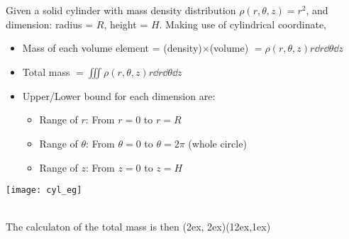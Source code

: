 \documentclass[class=article, crop=false, 12pt]{standalone}
\begin{document}
\begin{example}
    Given a solid cylinder with mass density distribution $\rho(r,\theta,z) = r^2$,
    and dimension: radius = $R$, height = $H$. 
    Making use of cylindrical coordinate,
    \begin{itemize}
        \item Mass of each volume element = (density)$\times$(volume) $= \rho(r,\theta,z)r\dd{r}\dd{\theta}\dd{z}$
        \item Total mass $= \iiint \rho(r,\theta,z) r\dd{r}\dd{\theta}\dd{z}$
    \end{itemize}

    \begin{minipage}{0.7\textwidth}
         \begin{itemize}
            \item Upper/Lower bound for each dimension are:
            \begin{itemize}
                \item Range of $r$: From $r=0$ to $r=R$
                \item Range of $\theta$: From $\theta=0$ to $\theta = 2\pi$ (whole circle)
                \item Range of $z$: From $z=0$ to $z=H$
            \end{itemize}
        \end{itemize}
    \end{minipage}
    \begin{minipage}{0.2\textwidth}
        \centering
        \texttt{[image: cyl\_eg]}
    \end{minipage}
   
    \hfill\\[1em]
    The calculaton of the total mass is then
    {(2ex, 2ex)}{(12ex,1ex)}
\end{example}
\end{document}
